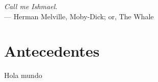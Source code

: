 \label{chap:web}
\begin{flushright}{\slshape
    Call me Ishmael.} \\ \medskip
    --- {Herman Melville, Moby-Dick; or, The Whale}
\end{flushright}
\minitoc\mtcskip
\vfill



\section{Antecedentes} 

Hola mundo

\vfill
\cleardoublepage
